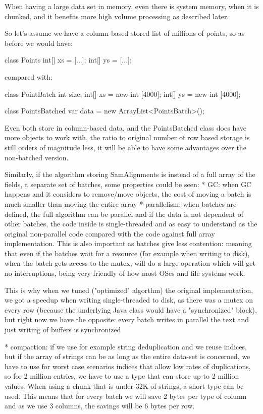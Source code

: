When having a large data set in memory, even there is system memory, when it is chunked, and it benefits more high volume processing as described later.

So let's assume we have a column-based stored list of millions of points, so as before we would have:

class Points
{
	int[] xs = [...];
	int[] ys = [...];
} 

compared with:

class PointBatch
{
    int size;	
	int[] xs = new int [4000];
	int[] ys = new int [4000];
} 

class PointsBatched
{
	var data = new ArrayList<PointsBatch>();
}

Even both store in column-based data, and the PointsBatched class does have more objects to work with, the ratio to original number of row based storage is still orders of magnitude less, it will be able to have some advantages over the non-batched version.

Similarly, if the algorithm storing SamAlignments is instead of a full array of the fields, a separate set of batches, some properties could be seen:
* GC: when GC happens and it considers to remove/move objects, the cost of moving a batch is much smaller than moving the entire array
* parallelism: when batches are defined, the full algorithm can be parallel and if the data is not dependent of other batches, the code inside is single-threaded and as easy to understand as the original non-parallel code compared with the code against full array implementation. 
This is also important as batches give less contention: meaning that even if the batches wait for a resource (for example when writing to disk), when the batch gets access to the mutex, will do a large operation which will get no interruptions, being very friendly of how most OSes and file systems work.

This is why when we tuned ("optimized" algorthm) the original implementation, we got a speedup when writing single-threaded to disk, as there was a mutex on every row (because the underlying Java class would have a "synchronized" block), but right now we have the opposite: every batch writes in parallel the text and just writing of buffers is synchronized

* compaction: if we use for example string deduplication and we reuse indices, but if the array of strings can be as long as the entire data-set is concerned, we have to use for worst case scenarios indices that allow low rates of duplications, so for 2 million entries, we have to use a type that can store up-to 2 million values.
When using a chunk that is under 32K of strings, a short type can be used. This means that for every batch we will save 2 bytes per type of column and as we use 3 columns, the savings will be 6 bytes per row.

